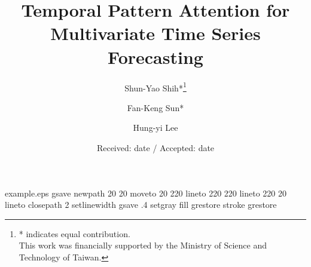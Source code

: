 \begin{filecontents*}{example.eps}
gsave
newpath
  20 20 moveto
  20 220 lineto
  220 220 lineto
  220 20 lineto
closepath
2 setlinewidth
gsave
  .4 setgray fill
grestore
stroke
grestore
\end{filecontents*}
\RequirePackage{fix-cm}
\documentclass[smallextended]{svjour3}       \smartqed  \usepackage{graphicx}
\usepackage{amsmath}
\usepackage{amsfonts}
\usepackage{amssymb}
\usepackage{booktabs}
\usepackage{array}
\usepackage{url}  \usepackage{breakcites}
\usepackage{hyperref}
\newcolumntype{P}[1]{>{\centering\arraybackslash}p{#1}}


\title{Temporal Pattern Attention for Multivariate Time Series Forecasting
}




\author{Shun-Yao Shih*\thanks{* indicates equal contribution. \\ This work was financially supported by the Ministry of Science and Technology of Taiwan.} \and
        Fan-Keng Sun* \and 
        Hung-yi Lee }




\date{Received: date / Accepted: date}


\maketitle

\begin{abstract}
Forecasting of multivariate time series data, for instance the prediction of electricity consumption, solar power production, and polyphonic piano pieces, has numerous valuable applications.
However, complex and non-linear interdependencies between time steps and series complicate this task. 
To obtain accurate prediction, it is crucial to model long-term dependency in time series data, which can be achieved by recurrent neural networks (RNNs) with an attention mechanism.
The typical attention mechanism reviews the information at each previous time step and selects relevant information to help generate the outputs; however, it fails to capture temporal patterns across multiple time steps.
In this paper, we propose using a set of filters to extract time-invariant temporal patterns, similar to transforming time series data into its ``frequency domain''.
Then we propose a novel attention mechanism to select relevant time series, and use its frequency domain information for multivariate forecasting. 
We apply the proposed model on several real-world tasks and achieve state-of-the-art performance in almost all of cases.
Our source code is available at \href{https://github.com/gantheory/TPA-LSTM}{https://github.com/gantheory/TPA-LSTM}.
\end{abstract}

